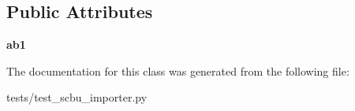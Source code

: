 \subsection*{Public Attributes}
\begin{DoxyCompactItemize}
\item 
\hypertarget{classtests_1_1test__scbu__importer_1_1_antibiogram__test_a3e339cbfda0dc6ecdd9be895e274fb1e}{{\bfseries ab1}}\label{classtests_1_1test__scbu__importer_1_1_antibiogram__test_a3e339cbfda0dc6ecdd9be895e274fb1e}

\end{DoxyCompactItemize}


The documentation for this class was generated from the following file\-:\begin{DoxyCompactItemize}
\item 
tests/test\-\_\-scbu\-\_\-importer.\-py\end{DoxyCompactItemize}
